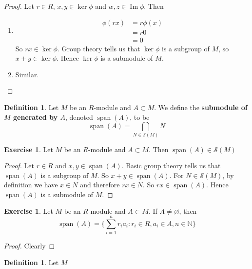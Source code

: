 \documentclass[12pt]{amsart}
\theoremstyle{definition}
\newtheorem{defn}[definition]{Definition}
\newtheorem{ex}[definition]{Exercise}
\newcommand{\N}{\mathbb{N}}
\newcommand{\MS}{\mathcal{S}}
\DeclareMathOperator{\spn}{span}
\DeclareMathOperator{\Img}{Im}
\begin{document}
	\begin{proof}
	Let $r \in R$, $x,y \in \ker \phi$ and $w,z \in \Img \phi$. Then 
	\begin{enumerate}
	\item 
	\begin{align*}
	\phi(rx) 
	&= r\phi(x) \\
	&=r 0 \\
	&= 0
\end{align*}	
	So $rx \in \ker \phi$. Group theory tells us that $\ker \phi$ is a subgroup of $M$, so $x+y \in \ker \phi$. Hence $\ker \phi$ is a submodule of $M$. 
	\item Similar.
	\end{enumerate}
	\end{proof}
	
	\begin{defn}
	Let $M$ be an $R$-module and $A \subset M$. We define the \textbf{submodule of $M$ generated by $A$}, denoted $\spn(A)$, to be $$\spn(A) = \bigcap_{N \in \MS(M)} N$$ 
	\end{defn}
	
	\begin{ex}
	Let $M$ be an $R$-module and $A \subset M$. Then 
	$\spn(A) \in \MS(M)$
	\end{ex}
	
	\begin{proof}
	Let $r \in R$ and $x,y \in \spn(A)$. Basic group theory tells us that $\spn(A)$ is a subgroup of $M$. So $x+y \in \spn(A)$. For $N \in \MS(M)$, by definition we have $x \in N$ and therefore $rx \in N$. So $rx \in \spn(A)$. Hence $\spn(A)$ is a submodule of $M$.
	\end{proof}
	
	\begin{ex}
	Let $M$ be an $R$-module and $A \subset M$. If $A \neq \varnothing$, then $$\spn(A) = \bigg \{\sum\limits_{i=1}^n r_ia_i: r_i \in R, a_i \in A, n \in \N \bigg \}$$
	\end{ex}
	
	\begin{proof}
	Clearly 
	\end{proof}
	
	\begin{defn}
	Let $M$
	\end{defn}
	
	
	
	
	
	
	
	
	
	
	
\end{document}
